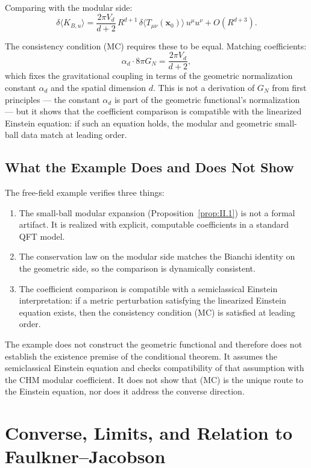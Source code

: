 \documentclass[12pt]{article}
\theoremstyle{definition}
\theoremstyle{remark}
\begin{document}
Comparing with the modular side:
\[
\delta\langle K_{B,u}\rangle
=
\frac{2\pi V_d}{d+2}\,R^{d+1}\,\delta\langle T_{\mu\nu}(\mathbf{x}_0)\rangle\,u^\mu u^\nu
+
O(R^{d+3}).
\]

The consistency condition (MC) requires these to be equal. Matching coefficients:
\[
\alpha_d\cdot 8\pi G_N = \frac{2\pi V_d}{d+2},
\]
which fixes the gravitational coupling in terms of the geometric normalization constant \(\alpha_d\) and the spatial dimension \(d\). This is not a derivation of \(G_N\) from first principles --- the constant \(\alpha_d\) is part of the geometric functional's normalization --- but it shows that the coefficient comparison is compatible with the linearized Einstein equation: if such an equation holds, the modular and geometric small-ball data match at leading order.

\subsection{What the Example Does and Does Not Show}\label{subsec:5.7}

The free-field example verifies three things:
\begin{enumerate}
\item The small-ball modular expansion (Proposition~\ref{prop:II.1}) is not a formal artifact. It is realized with explicit, computable coefficients in a standard QFT model.
\item The conservation law on the modular side matches the Bianchi identity on the geometric side, so the comparison is dynamically consistent.
\item The coefficient comparison is compatible with a semiclassical Einstein interpretation: if a metric perturbation satisfying the linearized Einstein equation exists, then the consistency condition (MC) is satisfied at leading order.
\end{enumerate}

The example does not construct the geometric functional and therefore
does not establish the existence premise of the conditional theorem. It
assumes the semiclassical Einstein equation and checks compatibility of
that assumption with the CHM modular coefficient. It does not show that
(MC) is the unique route to the Einstein equation, nor does it address
the converse direction.

\section{Converse, Limits, and Relation to Faulkner--Jacobson}\label{sec:6}
\end{document}
